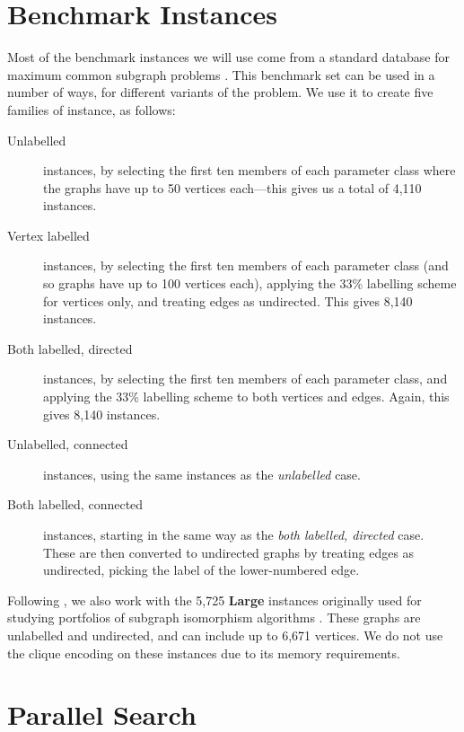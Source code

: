\documentclass[sigconf]{acmart}
\begin{document}
\section{Benchmark Instances}

Most of the benchmark instances we will use come from a standard database for maximum common
subgraph problems \citep{DBLP:journals/prl/SantoFSV03,DBLP:journals/jgaa/ConteFV07}. This benchmark
set can be used in a number of ways, for different variants of the problem. We use it to create five
families of instance, as follows:

\begin{description}
    \item[Unlabelled] instances, by selecting the first ten members of each parameter class where the
        graphs have up to 50 vertices each---this gives us a total of 4,110 instances.

    \item[Vertex labelled] instances, by selecting the first ten members of each parameter class
        (and so graphs have up to 100 vertices each), applying the 33\% labelling scheme for
        vertices only, and treating edges as undirected. This gives 8,140 instances.

    \item[Both labelled, directed] instances, by selecting the first ten members of each parameter
        class, and applying the 33\% labelling scheme to both vertices and edges. Again, this gives
        8,140 instances.

    \item[Unlabelled, connected] instances, using the same instances as the \emph{unlabelled} case.

    \item[Both labelled, connected] instances, starting in the same way as the \emph{both labelled,
        directed} case. These are then converted to undirected graphs by treating edges as
        undirected, picking the label of the lower-numbered edge.
\end{description}

\noindent
Following \citet{DBLP:conf/aaai/HoffmannMR17}, we also work with the 5,725 \textbf{Large} instances
originally used for studying portfolios of subgraph isomorphism algorithms
\citep{DBLP:conf/lion/KotthoffMS16}. These graphs are unlabelled and undirected, and can include up
to 6,671 vertices. We do not use the clique encoding on these instances due to its
memory requirements.


\section{Parallel Search}
\end{document}
